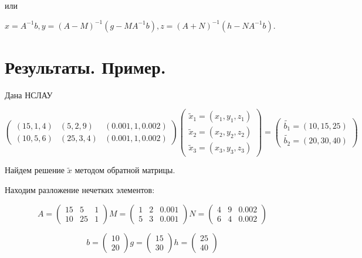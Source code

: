 \documentclass[12pt]{article}
\begin{document}
или

\begin{center}
	$ x = A^{-1}b, y = (A - M)^{-1} (g - MA^{-1}b), z = (A + N)^{-1} (h - NA^{-1}b) $.
\end{center}

\section{Результаты. Пример.}


Дана НСЛАУ

\[
	\begin{pmatrix}
		(15, 1, 4) & (5, 2, 9)  & (0.001, 1, 0.002) \\
		(10, 5, 6) & (25, 3, 4) & (0.001, 1, 0.002)
	\end{pmatrix}
	\begin{pmatrix}
		\tilde{x}_1 = (x_1, y_1, z_1) \\
		\tilde{x}_2 = (x_2, y_2, z_2) \\
		\tilde{x}_3 = (x_3, y_3, z_3)
	\end{pmatrix} =
	\begin{pmatrix}
		\tilde{b_1} = (10, 15, 25) \\
		\tilde{b_2} = (20, 30, 40)
	\end{pmatrix}
\]

Найдем решение $\tilde{x}$ методом обратной матрицы.

Находим разложение нечетких элементов:

\[
	A = \begin{pmatrix}
		15 & 5  & 1 \\
		10 & 25 & 1
	\end{pmatrix}
	M = \begin{pmatrix}
		1 & 2 & 0.001 \\
		5 & 3 & 0.001
	\end{pmatrix}
	N = \begin{pmatrix}
		4 & 9 & 0.002 \\
		6 & 4 & 0.002
	\end{pmatrix}
\]

\[
	b = \begin{pmatrix}
		10 \\
		20
	\end{pmatrix}
	g = \begin{pmatrix}
		15 \\
		30
	\end{pmatrix}
	h = \begin{pmatrix}
		25 \\
		40
	\end{pmatrix}
\]
\end{document}
